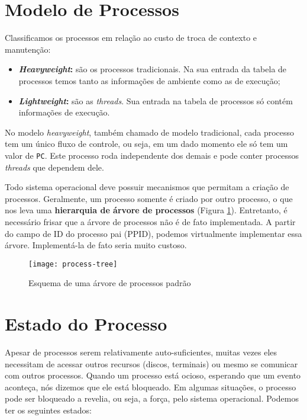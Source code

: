 \section{Modelo de Processos}
Classificamos os processos em relação ao custo de troca de contexto e manutenção:

\begin{itemize}
  \item \textbf{\textit{Heavyweight}:} são os processos tradicionais. Na sua entrada da tabela de processos temos tanto as informações de ambiente como as de execução;
  \item \textbf{\textit{Lightweight}:} são as \textit{threads}. Sua entrada na tabela de processos só contém informações de execução.
\end{itemize}

No modelo \textit{heavyweight}, também chamado de modelo tradicional, cada processo tem um único fluxo de controle, ou seja, em um dado momento ele só tem um valor de \texttt{PC}. Este processo roda independente dos demais e pode conter processos \textit{threads} que dependem dele.

Todo sistema operacional deve possuir mecanismos que permitam a criação de processos. Geralmente, um processo somente é criado por outro processo, o que nos leva uma \textbf{hierarquia de árvore de processos} (Figura \ref{fig:process-tree}). Entretanto, é necessário frisar que a árvore de processos não é de fato implementada. A partir do campo de ID do processo pai (PPID), podemos virtualmente implementar essa árvore. Implementá-la de fato seria muito custoso.

\begin{figure}[h]
  \centering
  \texttt{[image: process-tree]}
  \caption{Esquema de uma árvore de processos padrão}
  \label{fig:process-tree}
\end{figure}




















\section{Estado do Processo}
Apesar de processos serem relativamente auto-suficientes, muitas vezes eles necessitam de acessar outros recursos (discos, terminais) ou mesmo se comunicar com outros processos. Quando um processo está ocioso, esperando que um evento aconteça, nós dizemos que ele está bloqueado. Em algumas situações, o processo pode ser bloqueado a revelia, ou seja, a força, pelo sistema operacional. Podemos ter os seguintes estados:

